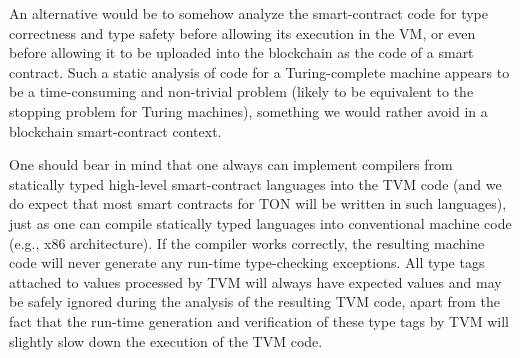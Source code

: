 \documentclass[12pt,oneside]{article}
\begin{document}
    An alternative would be to somehow analyze the smart-contract code for type correctness and type safety before allowing its execution in the VM, or even before allowing it to be uploaded into the blockchain as the code of a smart contract. Such a static analysis of code for a Turing-complete machine appears to be a time-consuming and non-trivial problem (likely to be equivalent to the stopping problem for Turing machines), something we would rather avoid in a blockchain smart-contract context.

    One should bear in mind that one always can implement compilers from statically typed high-level smart-contract languages into the TVM code (and we do expect that most smart contracts for TON will be written in such languages), just as one can compile statically typed languages into conventional machine code (e.g., x86 architecture). If the compiler works correctly, the resulting machine code will never generate any run-time type-checking exceptions. All type tags attached to values processed by TVM will always have expected values and may be safely ignored during the analysis of the resulting TVM code, apart from the fact that the run-time generation and verification of these type tags by TVM will slightly slow down the execution of the TVM code.
\end{document}
